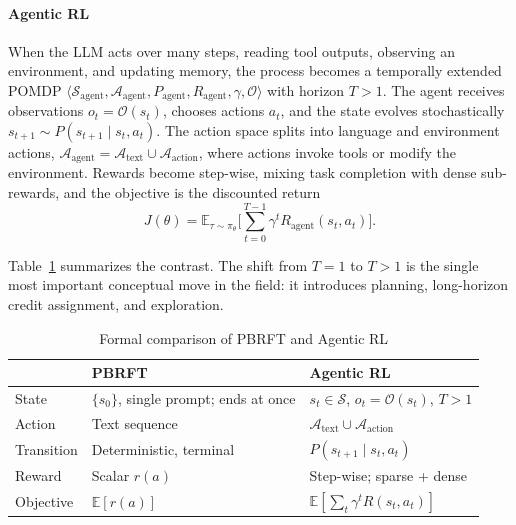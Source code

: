 \paragraph{Agentic RL} When the LLM acts over many steps, reading tool
outputs, observing an environment, and updating memory, the process becomes
a temporally extended POMDP
$\langle \mathcal{S}_{\text{agent}}, \mathcal{A}_{\text{agent}},
P_{\text{agent}}, R_{\text{agent}}, \gamma, \mathcal{O} \rangle$ with
horizon $T>1$. The agent receives observations $o_t=\mathcal{O}(s_t)$,
chooses actions $a_t$, and the state evolves stochastically
$s_{t+1}\sim P(s_{t+1}\mid s_t,a_t)$. The action space splits into
language and environment actions,
$\mathcal{A}_{\text{agent}}=\mathcal{A}_{\text{text}}\cup\mathcal{A}_{\text{action}}$, where actions invoke tools or modify the environment. Rewards become
step-wise, mixing task completion with dense sub-rewards, and the
objective is the discounted return
\begin{equation}
J(\theta)=\mathbb{E}_{\tau\sim\pi_\theta}\Big[\textstyle\sum_{t=0}^{T-1}
\gamma^t R_{\text{agent}}(s_t,a_t)\Big] .
\end{equation}

Table~\ref{tab:pbrft-vs-agentic} summarizes the contrast. The shift from
$T{=}1$ to $T{>}1$ is the single most important conceptual move in the
field: it introduces planning, long-horizon credit assignment, and
exploration.

\begin{table}[t]
\centering
\caption{Formal comparison of PBRFT and Agentic RL}
\label{tab:pbrft-vs-agentic}
\renewcommand{\arraystretch}{1.25}
\begin{tabular}{@{}p{}p{}p{}@{}}
\toprule
& PBRFT & Agentic RL \\
\midrule
State & $\{s_0\}$, single prompt; ends at once & $s_t\in\mathcal{S}$, $o_t=\mathcal{O}(s_t)$, $T>1$ \\
Action & Text sequence & $\mathcal{A}_{\text{text}}\cup\mathcal{A}_{\text{action}}$ \\
Transition & Deterministic, terminal & $P(s_{t+1}\mid s_t,a_t)$ \\
Reward & Scalar $r(a)$ & Step-wise; sparse + dense \\
Objective & $\mathbb{E}[r(a)]$ & $\mathbb{E}[\sum_t \gamma^t R(s_t,a_t)]$ \\
\bottomrule
\end{tabular}
\end{table}

